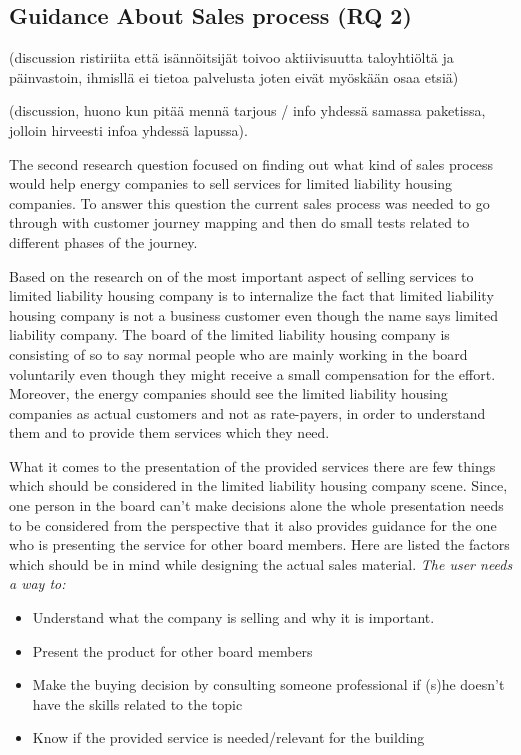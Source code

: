 \subsection{Guidance About Sales process (RQ 2)}

(discussion ristiriita että isännöitsijät toivoo aktiivisuutta taloyhtiöltä ja päinvastoin, ihmisllä ei tietoa palvelusta joten eivät myöskään osaa etsiä)

(discussion, huono kun pitää mennä tarjous / info yhdessä samassa paketissa, jolloin hirveesti infoa yhdessä lapussa).

The second research question focused on finding out what kind of sales process would help energy companies to sell services for limited liability housing companies. To answer this question the current sales process was needed to go through with customer journey mapping and then do small tests related to different phases of the journey.

Based on the research on of the most important aspect of selling services to limited liability housing company is to internalize the fact that limited liability housing company is not a business customer even though the name says limited liability company. The board of the limited liability housing company is consisting of so to say normal people who are mainly working in the board voluntarily even though they might receive a small compensation for the effort. Moreover, the energy companies should see the limited liability housing companies as actual customers and not as rate-payers, in order to understand them and to provide them services which they need.

What it comes to the presentation of the provided services there are few things which should be considered in the limited liability housing company scene. Since, one person in the board can't make decisions alone the whole presentation needs to be considered from the perspective that it also provides guidance for the one who is presenting the service for other board members. Here are listed the factors which should be in mind while designing the actual sales material. \emph{The user needs a way to:}
\begin{itemize}
\item Understand what the company is selling and why it is important.
\item Present the product for other board members
\item Make the buying decision by consulting someone professional if (s)he doesn't have the skills related to the topic
\item Know if the provided service is needed/relevant for the building
\end{itemize}

